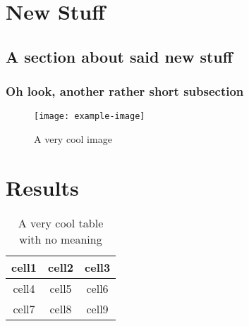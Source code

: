 \documentclass[letterpaper, openany, 12pt, oneside]{uithesis}
\begin{document}
\chapter{New Stuff}
\lipsum[21-40]

\section{A section about said new stuff}
\lipsum[41-45]

\subsection{Oh look, another rather short subsection}
\begin{figure}[!htb]
	\centering
	\texttt{[image: example-image]}
	\caption{A very cool image}%
	\label{fig:four}
\end{figure}
\lipsum[46-47]

\chapter{Results}
\begin{table}
	\centering
	\label{table:one}
	\begin{tabular}{ c c c }
		cell1 & cell2 & cell3 \\ \hline
		cell4 & cell5 & cell6 \\ \hline
		cell7 & cell8 & cell9
	\end{tabular}
	\caption{A very cool table with no meaning}
\end{table}
\lipsum[48-61]

\backmatter

\printbibliography
\end{document}
